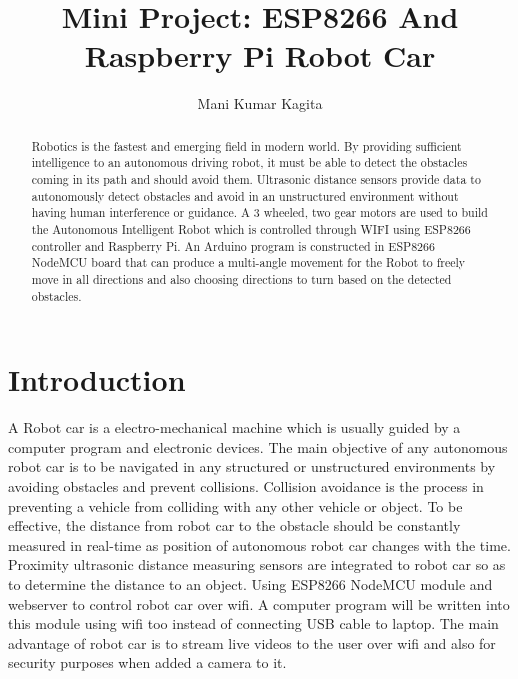 \documentclass[sigconf]{acmart}
\begin{document}
\title{Mini Project: ESP8266 And Raspberry Pi Robot Car}

\author{Mani Kumar Kagita}


\begin{abstract}
Robotics is the fastest and emerging field in modern world. By providing sufficient intelligence to an autonomous driving robot, it must be able to detect the obstacles coming in its path and should avoid them. Ultrasonic distance sensors provide data to autonomously detect obstacles and avoid in an unstructured environment without having human interference or guidance. A 3 wheeled, two gear motors are used to build the Autonomous Intelligent Robot which is controlled through WIFI using ESP8266 controller and Raspberry Pi. An Arduino program is constructed in ESP8266 NodeMCU board that can produce a multi-angle movement for the Robot to freely move in all directions and also choosing directions to turn based on the detected obstacles. 

\end{abstract}


\maketitle

\section{Introduction}
A Robot car is a electro-mechanical machine which is usually guided by a computer program and electronic devices. The main objective of any autonomous robot car is to be navigated in any structured or unstructured environments by avoiding obstacles and prevent collisions. 
Collision avoidance is the process in preventing a vehicle from colliding with any other vehicle or object. 
To be effective, the distance from robot car to the obstacle should be constantly measured in real-time as position of autonomous robot car changes with the time.
Proximity ultrasonic distance measuring sensors are integrated to robot car so as to determine the distance to an object. Using ESP8266 NodeMCU module and webserver to control robot car over wifi. A computer program will be written into this module using wifi too instead of connecting USB cable to laptop. The main advantage of robot car is to stream live videos to the user over wifi and also for security purposes when added a camera to it.
\end{document}
